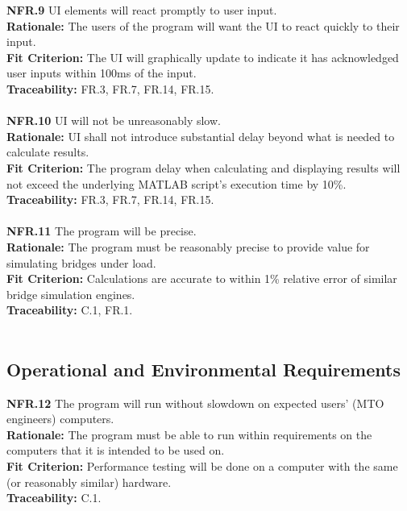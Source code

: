 \documentclass[12pt]{article}
\begin{document}
  \noindent\textbf{NFR.9} UI elements will react promptly to user input.\\
  \textbf{Rationale:} The users of the program will want the UI to react quickly to their input.\\
  \textbf{Fit Criterion:} The UI will graphically update to indicate it has acknowledged user inputs within 100ms of the input.\\
  \textbf{Traceability:} FR.3, FR.7, FR.14, FR.15.\\\\

  \noindent\textbf{NFR.10} UI will not be unreasonably slow.\\
  \textbf{Rationale:} UI shall not introduce substantial delay beyond what is needed to calculate results.\\
  \textbf{Fit Criterion:} The program delay when calculating and displaying results will not exceed the underlying MATLAB script's execution time by 10\%.\\
  \textbf{Traceability:} FR.3, FR.7, FR.14, FR.15.\\\\

  \noindent\textbf{NFR.11} The program will be precise.\\
  \textbf{Rationale:} The program must be reasonably precise to provide value for simulating bridges under load.\\
  \textbf{Fit Criterion:} Calculations are accurate to within 1\% relative error of similar bridge simulation engines.\\
  \textbf{Traceability:} C.1, FR.1.\\\\

\subsection{Operational and Environmental Requirements}

  \textbf{NFR.12} The program will run without slowdown on expected users' (MTO engineers) computers.\\
  \textbf{Rationale:} The program must be able to run within requirements on the computers that it is intended to be used on.\\
  \textbf{Fit Criterion:} Performance testing will be done on a computer with the same (or reasonably similar) hardware.\\
  \textbf{Traceability:} C.1.\\\\
\end{document}
